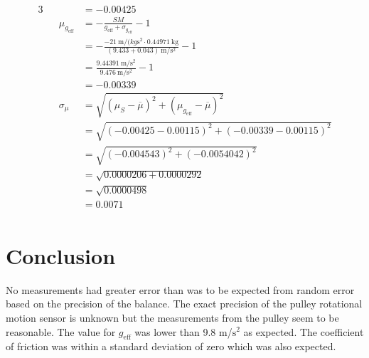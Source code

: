 \documentclass[12pt]{article}
\begin{document}
\begin{alignat*}{3}
            &&& = -0.00425\\
            && \mu_{g_\mathrm{eff}} &= -\frac{SM}{g_{\mathrm{eff}}+\sigma_{g_\mathrm{eff}}}-1\\
            &&& = -\frac{-21~\mathrm{m}/(kg\mathrm{s}^2 \cdot 0.44971~\mathrm{kg}}{(9.433 + 0.043)~\mathrm{m}/\mathrm{s}^2}-1\\
            &&& = \frac{9.44391~\mathrm{m}/\mathrm{s}^2}{9.476~\mathrm{m}/\mathrm{s}^2}-1\\
            &&& = -0.00339\\
            && \sigma_\mu &= \sqrt{(\mu_S - \overline{\mu})^2 + (\mu_{g_\mathrm{eff}} - \overline{\mu})^2}\\
            &&& = \sqrt{(-0.00425-0.00115)^2 + (-0.00339-0.00115)^2}\\
            &&& = \sqrt{(-0.004543)^2+(-0.0054042)^2}\\
            &&& = \sqrt{0.0000206+0.0000292}\\
            &&& = \sqrt{0.0000498}\\
            &&& = 0.0071\\
        \end{alignat*}
    \section{Conclusion}
    No measurements had greater error than was to be expected from random error based on the precision of the balance. The exact precision of the pulley rotational motion sensor is unknown but the measurements from the pulley seem to be reasonable. The value for \(g_\mathrm{eff}\) was lower than 9.8 m/\(\mathrm{s}^2\) as expected. The coefficient of friction was within a standard deviation of zero which was also expected.
\end{document}
